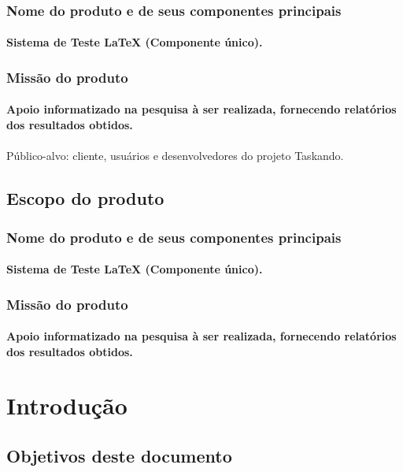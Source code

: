 		\subsubsection{Nome do produto e de seus componentes principais}
			\paragraph{Sistema de Teste LaTeX (Componente único). }
		\subsubsection{Missão do produto}
			\paragraph{Apoio informatizado na pesquisa à ser realizada, fornecendo relatórios dos resultados obtidos.}
			\paragraph{}Público-alvo: cliente, usuários e desenvolvedores do projeto Taskando.
	\subsection{Escopo do produto}
		\subsubsection{Nome do produto e de seus componentes principais}
			\paragraph{Sistema de Teste LaTeX (Componente único). }
		\subsubsection{Missão do produto}
			\paragraph{Apoio informatizado na pesquisa à ser realizada, fornecendo relatórios dos resultados obtidos.}
			
\newpage

\section{Introdução}
	\subsection{Objetivos deste documento}
